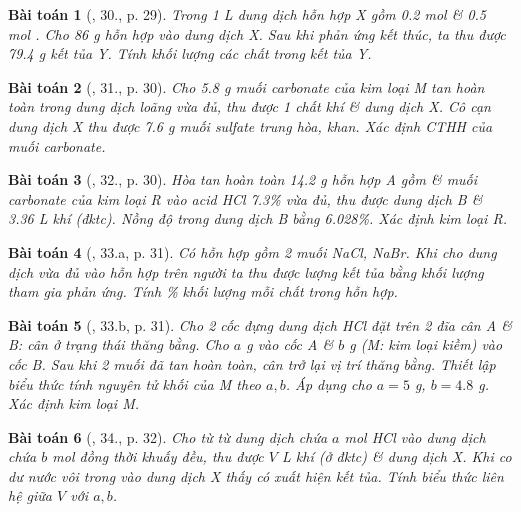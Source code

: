 \documentclass{article}
\newtheorem{baitoan}{Bài toán}
\begin{document}
\begin{baitoan}[\cite{An_350_BT_Hoa_Hoc_9}, 30., p. 29]
	Trong \emph{1 L} dung dịch hỗn hợp X gồm \emph{0.2 mol } \& \emph{0.5 mol }. Cho \emph{86 g} hỗn hợp \emph{} vào dung dịch X. Sau khi phản ứng kết thúc, ta thu được \emph{79.4 g} kết tủa Y. Tính khối lượng các chất trong kết tủa Y.
\end{baitoan}

\begin{baitoan}[\cite{An_350_BT_Hoa_Hoc_9}, 31., p. 30]
	Cho \emph{5.8 g} muối carbonate \emph{} của kim loại M tan hoàn toàn trong dung dịch \emph{} loãng vừa đủ, thu được 1 chất khí \& dung dịch X. Cô cạn dung dịch X thu được \emph{7.6 g} muối sulfate trung hòa, khan. Xác định CTHH của muối carbonate.
\end{baitoan}

\begin{baitoan}[\cite{An_350_BT_Hoa_Hoc_9}, 32., p. 30]
	Hòa tan hoàn toàn \emph{14.2 g} hỗn hợp A gồm \emph{} \& muối carbonate của kim loại R vào acid \emph{HCl 7.3\%} vừa đủ, thu được dung dịch B \& \emph{3.36 L} khí \emph{} (đktc). Nồng độ \emph{} trong dung dịch B bằng \emph{6.028\%}. Xác định kim loại R.
\end{baitoan}

\begin{baitoan}[\cite{An_350_BT_Hoa_Hoc_9}, 33.a, p. 31]
	Có hỗn hợp gồm 2 muối \emph{NaCl, NaBr}. Khi cho dung dịch \emph{} vừa đủ vào hỗn hợp trên người ta thu được lượng kết tủa bằng khối lượng \emph{} tham gia phản ứng. Tính \% khối lượng mỗi chất trong hỗn hợp.
\end{baitoan}

\begin{baitoan}[\cite{An_350_BT_Hoa_Hoc_9}, 33.b, p. 31]
	Cho 2 cốc đựng dung dịch \emph{HCl} đặt trên 2 đĩa cân A \& B: cân ở trạng thái thăng bằng. Cho $a$ \emph{g } vào cốc A \& $b$ \emph{g } (M: kim loại kiềm) vào cốc B. Sau khi 2 muối đã tan hoàn toàn, cân trở lại vị trí thăng bằng. Thiết lập biểu thức tính nguyên tử khối của M theo $a,b$. Áp dụng cho $a = 5$ \emph{g}, $b = 4.8$ \emph{g}. Xác định kim loại M.
\end{baitoan}

\begin{baitoan}[\cite{An_350_BT_Hoa_Hoc_9}, 34., p. 32]
	Cho từ từ dung dịch chứa $a$ \emph{mol HCl} vào dung dịch chứa $b$ \emph{mol } đồng thời khuấy đều, thu được $V$ \emph{L} khí (ở đktc) \& dung dịch X. Khi co dư nước vôi trong vào dung dịch X thấy có xuất hiện kết tủa. Tính biểu thức liên hệ giữa $V$ với $a,b$.
\end{baitoan}
\end{document}
